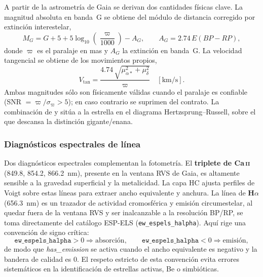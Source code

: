 A partir de la astrometría de Gaia se derivan dos cantidades físicas clave. La
magnitud absoluta en banda~G se obtiene del módulo de distancia corregido por
extinción interestelar,
\begin{equation}
  M_G = G + 5 + 5\log_{10}\!\left(\frac{\varpi}{1000}\right) - A_G,
  \qquad A_G = 2.74\,E(BP\!-\!RP),
  \label{eq:absmag}
\end{equation}
donde $\varpi$ es el paralaje en mas y $A_G$ la extinción en banda~G. La velocidad
tangencial se obtiene de los movimientos propios,
\begin{equation}
  V_\mathrm{tan} = \frac{4.74\,\sqrt{\mu_{\alpha*}^2 + \mu_\delta^2}}{\varpi}
  \quad [\si{\kilo\meter\per\second}].
  \label{eq:vtan}
\end{equation}
Ambas magnitudes sólo son físicamente válidas cuando el paralaje es confiable
(SNR $=\varpi/\sigma_\varpi > 5$); en caso contrario se suprimen del contrato. La
combinación de \MG{} y \teff{} sitúa a la estrella en el diagrama
Hertzsprung--Russell, sobre el que descansa la distinción gigante/enana.

\subsubsection{Diagnósticos espectrales de línea}
\label{sec:fund-lineas}

Dos diagnósticos espectrales complementan la fotometría. El \textbf{triplete de
Ca\,\textsc{ii}} (849.8, 854.2, \SI{866.2}{\nano\meter}), presente en la ventana
RVS de Gaia, es altamente sensible a la gravedad superficial y la metalicidad. La
capa HC ajusta perfiles de Voigt sobre estas líneas para extraer ancho equivalente
y anchura. La línea de \textbf{H$\alpha$} (\SI{656.3}{\nano\meter}) es un trazador
de actividad cromosférica y emisión circumestelar, al quedar fuera de la ventana
RVS y ser inalcanzable a la resolución BP/RP, se toma directamente del catálogo
ESP-ELS (\verb|ew_espels_halpha|). Aquí rige una convención de signo crítica:
\begin{equation}
  \texttt{ew\_espels\_halpha} > 0 \Rightarrow \text{absorción}, \qquad
  \texttt{ew\_espels\_halpha} < 0 \Rightarrow \text{emisión},
  \label{eq:halpha}
\end{equation}
de modo que \emph{has\_emission} se activa cuando el ancho equivalente es negativo
y la bandera de calidad es 0. El respeto estricto de esta convención evita errores
sistemáticos en la identificación de estrellas activas, Be o simbióticas.

